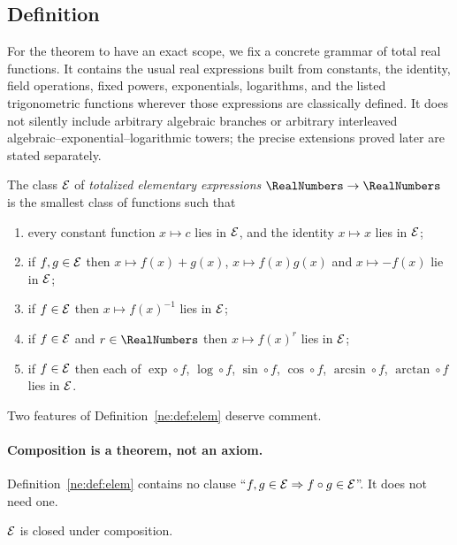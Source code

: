 \subsection{Definition}

For the theorem to have an exact scope, we fix a concrete grammar of total
real functions.  It contains the usual real expressions built from constants,
the identity, field operations, fixed powers, exponentials, logarithms, and
the listed trigonometric functions wherever those expressions are classically
defined.  It does not silently include arbitrary algebraic branches or
arbitrary interleaved algebraic--exponential--logarithmic towers; the precise
extensions proved later are stated separately.

\begin{definition}\label{ne:def:elem}
The class $\mathcal E$ of \emph{totalized elementary expressions}
$\RealNumbers\to\RealNumbers$ is the smallest
class of functions such that
\begin{enumerate}
\item every constant function $x\mapsto c$ lies in $\mathcal E$, and the identity
      $x\mapsto x$ lies in $\mathcal E$;
\item if $f,g\in\mathcal E$ then $x\mapsto f(x)+g(x)$, $x\mapsto f(x)g(x)$ and
      $x\mapsto -f(x)$ lie in $\mathcal E$;
\item if $f\in\mathcal E$ then $x\mapsto f(x)^{-1}$ lies in $\mathcal E$;
\item if $f\in\mathcal E$ and $r\in\RealNumbers$ then $x\mapsto f(x)^r$ lies in $\mathcal E$;
\item if $f\in\mathcal E$ then each of
      $\exp\circ f$, $\log\circ f$, $\sin\circ f$, $\cos\circ f$,
      $\arcsin\circ f$, $\arctan\circ f$ lies in $\mathcal E$.
\end{enumerate}
\end{definition}

Two features of Definition~\ref{ne:def:elem} deserve comment.

\paragraph{Composition is a theorem, not an axiom.}
Definition~\ref{ne:def:elem} contains no clause ``$f,g\in\mathcal E\Rightarrow f\circ
g\in\mathcal E$''.  It does not need one.

\begin{proposition}\label{ne:prop:comp}
$\mathcal E$ is closed under composition.
\end{proposition}

